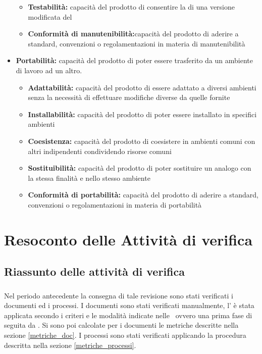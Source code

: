 \documentclass[12pt,a4paper]{article}
\begin{document}
\begin{itemize}
\begin{itemize}
		\item \textbf{Testabilità:} capacità del prodotto   di consentire la   di una versione modificata del  
		\item \textbf{Conformità di manutenibilità:}capacità del prodotto   di aderire a standard, convenzioni o regolamentazioni in materia di manutenibilità
	\end{itemize}
	\item \textbf{Portabilità:} capacità del prodotto   di poter essere trasferito da un ambiente di lavoro ad un altro.
	\begin{itemize}
		\item \textbf{Adattabilità:} capacità del prodotto   di essere adattato a diversi ambienti senza la necessità di effettuare modifiche diverse da quelle fornite
		\item \textbf{Installabilità: }capacità del prodotto   di poter essere installato in specifici ambienti
		\item \textbf{Coesistenza: }capacità del prodotto   di coesistere in ambienti comuni con altri   indipendenti condividendo risorse comuni
		\item \textbf{Sostituibilità:} capacità del prodotto   di poter sostituire un   analogo con la stessa finalità e nello stesso ambiente
		\item \textbf{ Conformità di portabilità:} capacità del prodotto   di aderire a standard, convenzioni o regolamentazioni in materia di portabilità
	\end{itemize}
\end{itemize}

\newpage
\appendix
\section{Resoconto delle Attività di verifica} \label{Resoconto delle attività di verifica}
\subsection{Riassunto delle \textbf{attività} di verifica} 
\subsubsection{\RR}
Nel periodo antecedente la consegna di tale revisione sono stati verificati i documenti ed i processi.
I documenti sono stati verificati manualmente, l'  è stata applicata secondo i criteri e le modalità indicate nelle \NdP\, ovvero una prima fase di  seguita da .
Si sono poi calcolate per i documenti le metriche descritte nella sezione \ref{metriche_doc}.
I processi sono stati verificati applicando la procedura descritta nella sezione \ref{metriche_processi}.
\end{document}
